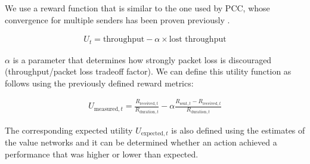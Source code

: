 \documentclass[10pt,sigconf,anonymous]{acmart}
\begin{document}

We use a reward function that is similar to the one used by PCC, whose convergence for multiple senders has been proven previously \cite{dong_pcc:_2015}. 

\begin{align}
U_t = \text{throughput} - \alpha \times \text{lost throughput}
\end{align}

$\alpha$ is a parameter that determines how strongly packet loss is discouraged (throughput/packet loss tradeoff factor). We can define this utility function as follows using the previously defined reward metrics: 

\begin{align}
U_{\text{measured},t} = \frac{R_{\text{received},t}}{R_{\text{duration},t}} - \alpha \frac{R_{\text{sent},t} - R_{\text{received},t}}{R_{\text{duration},t}}
\end{align}

The corresponding expected utility $U_{\text{expected},t}$ is also defined using the estimates of the value networks and it can be determined whether an action achieved a performance that was higher or lower than expected. 

%
%
\end{document}
